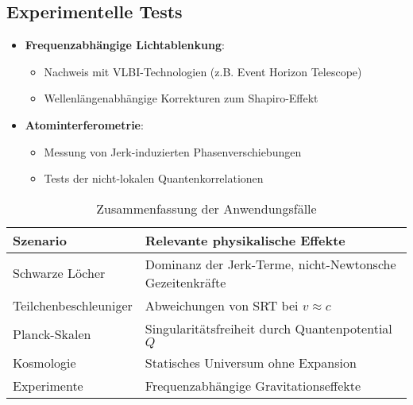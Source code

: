 \subsection{Experimentelle Tests}
\begin{itemize}
    \item \textbf{Frequenzabhängige Lichtablenkung}:
    \begin{itemize}
        \item Nachweis mit VLBI-Technologien (z.B. Event Horizon Telescope)
        \item Wellenlängenabhängige Korrekturen zum Shapiro-Effekt
    \end{itemize}
    
    \item \textbf{Atominterferometrie}:
    \begin{itemize}
        \item Messung von Jerk-induzierten Phasenverschiebungen
        \item Tests der nicht-lokalen Quantenkorrelationen
    \end{itemize}
\end{itemize}

\begin{table}[h]
\centering
\caption{Zusammenfassung der Anwendungsfälle}
\label{tab:applications}
\begin{tabular}{lp{8cm}}
\toprule
\textbf{Szenario} & \textbf{Relevante physikalische Effekte} \\
\midrule
Schwarze Löcher & Dominanz der Jerk-Terme, nicht-Newtonsche Gezeitenkräfte \\
Teilchenbeschleuniger & Abweichungen von SRT bei $v \approx c$ \\
Planck-Skalen & Singularitätsfreiheit durch Quantenpotential $Q$ \\
Kosmologie & Statisches Universum ohne Expansion \\
Experimente & Frequenzabhängige Gravitationseffekte \\
\bottomrule
\end{tabular}
\end{table}
